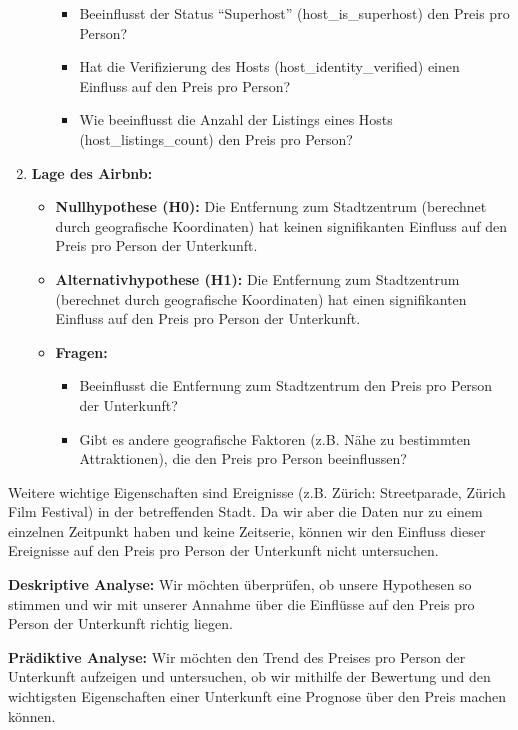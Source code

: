 \documentclass[
  journal,
]{IEEEtran}%
\providecommand{\tightlist}{%
  \setlength{\itemsep}{0pt}\setlength{\parskip}{0pt}}\usepackage{longtable,booktabs,array}
\begin{document}
\begin{enumerate}
\begin{itemize}
    \begin{itemize}
    \item
      Beeinflusst der Status ``Superhost'' (host\_is\_superhost) den
      Preis pro Person?
    \item
      Hat die Verifizierung des Hosts (host\_identity\_verified) einen
      Einfluss auf den Preis pro Person?
    \item
      Wie beeinflusst die Anzahl der Listings eines Hosts
      (host\_listings\_count) den Preis pro Person?
    \end{itemize}
  \end{itemize}
\item
  \textbf{Lage des Airbnb:}

  \begin{itemize}
  \item
    \textbf{Nullhypothese (H0):} Die Entfernung zum Stadtzentrum
    (berechnet durch geografische Koordinaten) hat keinen signifikanten
    Einfluss auf den Preis pro Person der Unterkunft.
  \item
    \textbf{Alternativhypothese (H1):} Die Entfernung zum Stadtzentrum
    (berechnet durch geografische Koordinaten) hat einen signifikanten
    Einfluss auf den Preis pro Person der Unterkunft.
  \item
    \textbf{Fragen:}

    \begin{itemize}
    \tightlist
    \item
      Beeinflusst die Entfernung zum Stadtzentrum den Preis pro Person
      der Unterkunft?
    \item
      Gibt es andere geografische Faktoren (z.B. Nähe zu bestimmten
      Attraktionen), die den Preis pro Person beeinflussen?
    \end{itemize}
  \end{itemize}
\end{enumerate}

Weitere wichtige Eigenschaften sind Ereignisse (z.B. Zürich:
Streetparade, Zürich Film Festival) in der betreffenden Stadt. Da wir
aber die Daten nur zu einem einzelnen Zeitpunkt haben und keine
Zeitserie, können wir den Einfluss dieser Ereignisse auf den Preis pro
Person der Unterkunft nicht untersuchen.

\textbf{Deskriptive Analyse:} Wir möchten überprüfen, ob unsere
Hypothesen so stimmen und wir mit unserer Annahme über die Einflüsse auf
den Preis pro Person der Unterkunft richtig liegen.

\textbf{Prädiktive Analyse:} Wir möchten den Trend des Preises pro
Person der Unterkunft aufzeigen und untersuchen, ob wir mithilfe der
Bewertung und den wichtigsten Eigenschaften einer Unterkunft eine
Prognose über den Preis machen können.
\end{document}

